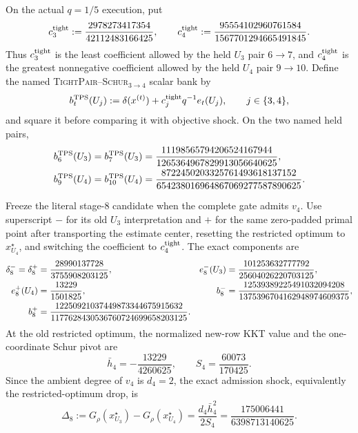\begin{proposition}
\label{prop:path-tight-pair-schur-bank}
On the actual $q=1/5$ execution, put
\begin{equation}
 c_3^{\rm tight}:=
 \frac{2978273417354}{42112483166425},
 \qquad
 c_4^{\rm tight}:=
 \frac{95554102960761584}{1567701294665491845}.
 \label{eq:path-tight-pair-coefficients}
\end{equation}
Thus $c_3^{\rm tight}$ is the least coefficient allowed by the held
$U_3$ pair $6\to7$, and $c_4^{\rm tight}$ is the greatest nonnegative
coefficient allowed by the held $U_4$ pair $9\to10$.  Define the named
\textnormal{\textsc{TightPair--Schur}}$_{3\to4}$ scalar bank by
\begin{equation}
 b_t^{\rm TPS}(U_j)
 :=\delta(x^{(t)})+c_j^{\rm tight}q^{-1}e_t(U_j),
 \qquad j\in\{3,4\},
 \label{eq:path-tight-pair-schur-bank}
\end{equation}
and square it before comparing it with objective shock.  On the two named
held pairs,
\begin{align}
 b_6^{\rm TPS}(U_3)=b_7^{\rm TPS}(U_3)
 &=\frac{11198565794206524167944}
         {1265364967829913056640625},
 \notag\\
 b_9^{\rm TPS}(U_4)=b_{10}^{\rm TPS}(U_4)
 &=\frac{8722450203325761493618137152}
         {654238016964867069277587890625}.
 \label{eq:path-tight-pair-held-values}
\end{align}

Freeze the literal stage-$8$ candidate when the complete gate admits $v_4$.
Use superscript $-$ for its old $U_3$ interpretation and $+$ for the same
zero-padded primal point after transporting the estimate center, resetting
the restricted optimum to $x_{U_4}^\star$, and switching the coefficient to
$c_4^{\rm tight}$.  The exact components are
\begin{align}
 \delta_8^- =\delta_8^+
 &=\frac{28990137728}{3755908203125},
 &e_8^-(U_3)
 &=\frac{101253632777792}{25604026220703125},
 \notag\\
 e_8^+(U_4)
 &=\frac{13229}{1501825},
 &b_8^-
 &=\frac{12539389225491032094208}
         {1375396704162948974609375},
 \notag\\
 b_8^+
 &=\frac{12250921037449873344675915632}
         {1177628430536760724699658203125}.
 \label{eq:path-tight-pair-reset-components}
\end{align}
At the old restricted optimum, the normalized new-row KKT value and the
one-coordinate Schur pivot are
\begin{equation}
 \bar h_4=-\frac{13229}{4260625},
 \qquad
 S_4=\frac{60073}{170425}.
 \label{eq:path-tight-pair-schur-data}
\end{equation}
Since the ambient degree of $v_4$ is $d_4=2$, the exact admission shock,
equivalently the restricted-optimum drop, is
\begin{equation}
 \Delta_8
 :=G_\rho(x_{U_3}^\star)-G_\rho(x_{U_4}^\star)
 =\frac{d_4\bar h_4^2}{2S_4}
 =\frac{175006441}{6398713140625}.
 \label{eq:path-tight-pair-schur-shock}
\end{equation}


\end{proposition}
